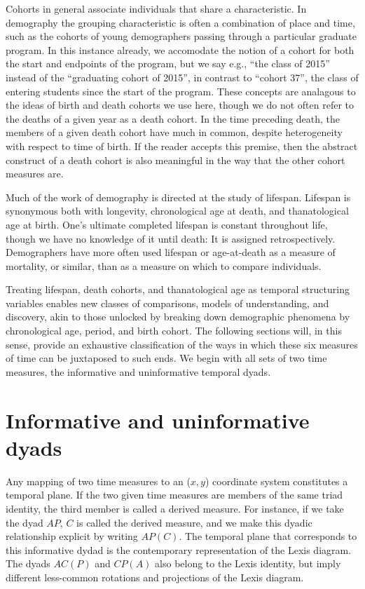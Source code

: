 \documentclass[11pt,oneside,a4paper]{article} %
\begin{document}
Cohorts in general associate individuals that share a characteristic. In
demography the grouping characteristic is often a combination of place and time, such as
the cohorts of young demographers passing through a particular graduate program.
In this instance already, we accomodate the notion of a cohort for both the
start and endpoints of the program, but we say e.g., ``the class of 2015''
instead of the ``graduating cohort of 2015'', in contrast to ``cohort 37'', the
 class of entering students since the start of the program.
These concepts are analagous to the ideas of birth and death cohorts we use here, though we do not often refer to the
deaths of a given year as a death cohort. In the time preceding
death, the members of a given death cohort have much in common, despite
heterogeneity with respect to time of birth. If the reader accepts this premise,
then the abstract construct of a death cohort is also meaningful in
the way that the other cohort measures are.

Much of the work of demography is directed at the study of lifespan. Lifespan is
synonymous both with longevity, chronological age at death, and thanatological
age at birth. One's ultimate completed lifespan is constant throughout life,
though we have no knowledge of it until death: It is assigned retrospectively.
Demographers have more often used lifespan or age-at-death as a measure of mortality, or similar, than as a measure on which to compare individuals. 

Treating lifespan,
death cohorts, and thanatological age as temporal structuring variables
enables new classes of comparisons, models of understanding, and discovery,
akin to those unlocked by breaking down demographic phenomena by chronological age,
period, and birth cohort. The following sections will, in this sense, provide an
exhaustive classification of the ways in which these six measures of time can be juxtaposed to such ends.
We begin with all sets of two time measures, the informative and uninformative
temporal dyads.

\FloatBarrier

\section*{Informative and uninformative dyads}

Any mapping of two time measures to an ($x,y$) coordinate
system constitutes a temporal plane. If the two given time measures are members of the same triad identity, the third member is called a derived
measure. For instance, if we take the dyad $AP$, $C$ is called the derived
measure, and we make this dyadic relationship explicit by writing $AP(C)$.
The temporal plane that corresponds to this informative dydad is the contemporary representation of the
Lexis diagram. The dyads $AC(P)$ and $CP(A)$ also belong to the Lexis identity, but imply different less-common rotations and projections of the Lexis
diagram. 
\end{document}
